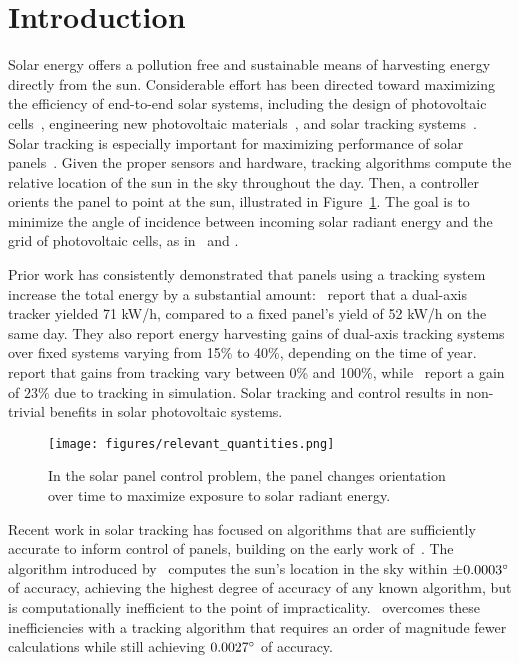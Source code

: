 \documentclass{article}
\begin{document}
\section{Introduction}
Solar energy offers a pollution free and sustainable means of harvesting energy directly from the sun. Considerable effort has been directed toward maximizing the efficiency of end-to-end solar systems, including the design of photovoltaic cells~\cite{li2012molecular}, engineering new photovoltaic materials~\cite{li2005high}, and solar tracking systems~\cite{camacho2012control}. Solar tracking is especially important for maximizing performance of solar panels~\cite{Eke2012,Rizk2008,King2001}. Given the proper sensors and hardware, tracking algorithms compute the relative location of the sun in the sky throughout the day. Then, a controller orients the panel to point at the sun, illustrated in Figure~\ref{fig:solar}. The goal is to minimize the angle of incidence between incoming solar radiant energy and the grid of photovoltaic cells, as in~\citet{Eke2012} and \citet{Benghanem2011}.

Prior work has consistently demonstrated that panels using a tracking system increase the total energy by a substantial amount:~\citet{Eke2012} report that a dual-axis tracker yielded 71 kW/h, compared to a fixed panel's yield of 52 kW/h on the same day. They also report energy harvesting gains of dual-axis tracking systems over fixed systems varying from 15\% to 40\%, depending on the time of year.~\citet{mousazadeh2009review} report that gains from tracking vary between 0\% and 100\%, while~\citet{clifford2004design} report a gain of $23\%$ due to tracking in simulation. Solar tracking and control results in non-trivial benefits in solar photovoltaic systems.

\begin{figure}[b!]
\begin{center}
\texttt{[image: figures/relevant\_quantities.png]}
\caption{In the solar panel control problem, the panel changes orientation over time to maximize exposure to solar radiant energy.}
\label{fig:solar}
\end{center}
\end{figure}

Recent work in solar tracking has focused on algorithms that are sufficiently accurate to inform control of panels, building on the early work of~\citet{spencer1971fourier}. The algorithm introduced by~\citet{reda2004solar} computes the sun's location in the sky within $\pm 0.0003\degree$ of accuracy, achieving the highest degree of accuracy of any known algorithm, but is computationally inefficient to the point of impracticality.~\citet{Grena2008} overcomes these inefficiencies with a tracking algorithm that requires an order of magnitude fewer calculations while still achieving $0.0027\degree$ of accuracy.
\end{document}
